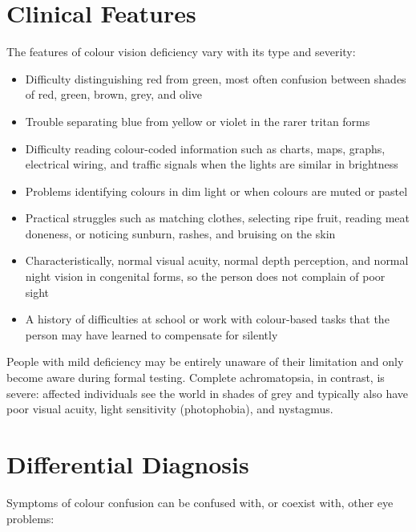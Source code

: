 \section*{Clinical Features}
The features of colour vision deficiency vary with its type and severity:

\begin{itemize}
    \item Difficulty distinguishing red from green, most often confusion between shades of red, green, brown, grey, and olive
    \item Trouble separating blue from yellow or violet in the rarer tritan forms
    \item Difficulty reading colour-coded information such as charts, maps, graphs, electrical wiring, and traffic signals when the lights are similar in brightness
    \item Problems identifying colours in dim light or when colours are muted or pastel
    \item Practical struggles such as matching clothes, selecting ripe fruit, reading meat doneness, or noticing sunburn, rashes, and bruising on the skin
    \item Characteristically, normal visual acuity, normal depth perception, and normal night vision in congenital forms, so the person does not complain of poor sight
    \item A history of difficulties at school or work with colour-based tasks that the person may have learned to compensate for silently
\end{itemize}

People with mild deficiency may be entirely unaware of their limitation and only become aware during formal testing. Complete achromatopsia, in contrast, is severe: affected individuals see the world in shades of grey and typically also have poor visual acuity, light sensitivity (photophobia), and nystagmus.

\section*{Differential Diagnosis}
Symptoms of colour confusion can be confused with, or coexist with, other eye problems:

